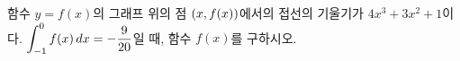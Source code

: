함수 $y=f(x)$의 그래프 위의 점 $(x{,}\mkern3mu\mathopen{}f(x))$에서의 접선의 기울기가 $4x^3+3x^2+1$이다. $\displaystyle\int_{-1}^{0}f(x)\mkern3mu dx=-\dfrac{9}{20}$일 때, 함수 $f(x)$를 구하시오.
